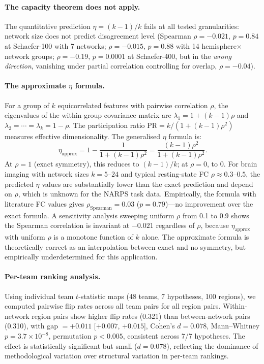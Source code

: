 \documentclass[11pt,a4paper]{article}
\begin{document}
\paragraph{The capacity theorem does not apply.}
The quantitative prediction $\eta = (k-1)/k$ fails at all tested granularities: network size does not predict disagreement level (Spearman $\rho = -0.021$, $p = 0.84$ at Schaefer-100 with 7 networks; $\rho = -0.015$, $p = 0.88$ with 14 hemisphere$\times$network groups; $\rho = -0.19$, $p = 0.0001$ at Schaefer-400, but in the \emph{wrong direction}, vanishing under partial correlation controlling for overlap, $\rho = -0.04$).

\paragraph{The approximate $\eta$ formula.}
For a group of $k$ equicorrelated features with pairwise correlation $\rho$, the eigenvalues of the within-group covariance matrix are $\lambda_1 = 1 + (k-1)\rho$ and $\lambda_2 = \cdots = \lambda_k = 1 - \rho$.  The participation ratio $\mathrm{PR} = k / (1 + (k-1)\rho^2)$ measures effective dimensionality.  The generalised $\eta$ formula is:
\[
\eta_{\mathrm{approx}} = 1 - \frac{1}{1 + (k-1)\rho^2} = \frac{(k-1)\rho^2}{1 + (k-1)\rho^2}.
\]
At $\rho = 1$ (exact symmetry), this reduces to $(k-1)/k$; at $\rho = 0$, to $0$.  For brain imaging with network sizes $k = 5$--$24$ and typical resting-state FC $\rho \approx 0.3$--$0.5$, the predicted $\eta$ values are substantially lower than the exact prediction and depend on $\rho$, which is unknown for the NARPS task data.  Empirically, the formula with literature FC values gives $\rho_{\mathrm{Spearman}} = 0.03$ ($p = 0.79$)---no improvement over the exact formula.  A sensitivity analysis sweeping uniform $\rho$ from 0.1 to 0.9 shows the Spearman correlation is invariant at $-0.021$ regardless of $\rho$, because $\eta_{\mathrm{approx}}$ with uniform $\rho$ is a monotone function of $k$ alone.  The approximate formula is theoretically correct as an interpolation between exact and no symmetry, but empirically underdetermined for this application.

\paragraph{Per-team ranking analysis.}
Using individual team $t$-statistic maps (48 teams, 7 hypotheses, 100 regions), we computed pairwise flip rates across all team pairs for all region pairs.  Within-network region pairs show higher flip rates (0.321) than between-network pairs (0.310), with gap $= +0.011$ [$+0.007$, $+0.015$], Cohen's $d = 0.078$, Mann--Whitney $p = 3.7 \times 10^{-8}$, permutation $p < 0.005$, consistent across 7/7 hypotheses.  The effect is statistically significant but small ($d = 0.078$), reflecting the dominance of methodological variation over structural variation in per-team rankings.
\end{document}
